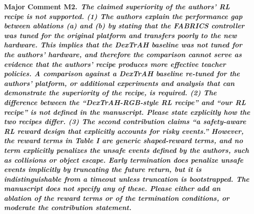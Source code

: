 \documentclass[11pt]{article}
\newcounter{reviewcomment}
\newcommand{\reviewcommentlabel}[2]{%
  \refstepcounter{reviewcomment}
  \par\medskip
  \noindent\colorbox{draftgray}{%
    \parbox{\dimexpr\linewidth-2\fboxsep\relax}{%
      \textbf{#1.}\ \textbf{\itshape #2}%
    }%
  }\par\smallskip
}
\begin{document}
\reviewcommentlabel{Major Comment M2}{The claimed superiority of the authors'
RL recipe is not supported. (1) The authors explain the performance gap between
ablations (a) and (b) by stating that the FABRICS controller was tuned for the
original platform and transfers poorly to the new hardware. This implies that
the DexTrAH baseline was not tuned for the authors' hardware, and therefore the
comparison cannot serve as evidence that the authors' recipe produces more
effective teacher policies. A comparison against a DexTrAH baseline re-tuned
for the authors' platform, or additional experiments and analysis that can
demonstrate the superiority of the recipe, is required. (2) The difference
between the ``DexTrAH-RGB-style RL recipe'' and ``our RL recipe'' is not defined
in the manuscript. Please state explicitly how the two recipes differ. (3) The
second contribution claims ``a safety-aware RL reward design that explicitly
accounts for risky events.'' However, the reward terms in Table I are generic
shaped-reward terms, and no term explicitly penalizes the unsafe events defined
by the authors, such as collisions or object escape. Early termination does
penalize unsafe events implicitly by truncating the future return, but it is
indistinguishable from a timeout unless truncation is bootstrapped. The
manuscript does not specify any of these. Please either add an ablation of the
reward terms or of the termination conditions, or moderate the contribution
statement.}
\end{document}

